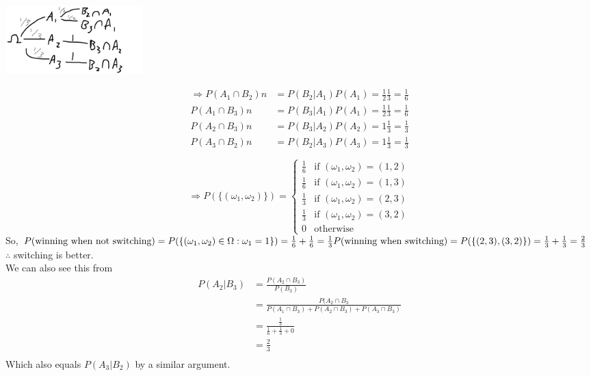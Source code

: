\documentclass{article}
\begin{document}
\begin{myex}{}{}
\begin{enumerate}
			\includegraphics[width=200px]{tree2.png}
			
			\begin{align*}
				\Rightarrow P(A_1\cap B_2) n&=P(B_2|A_1)P(A_1)=\frac{1}{2}\frac{1}{3}=\frac{1}{6}\\
				P(A_1\cap B_3) n&=P(B_3|A_1)P(A_1)=\frac{1}{2}\frac{1}{3}=\frac{1}{6}\\
				P(A_2\cap B_3) n&=P(B_3|A_2)P(A_2)=1\frac{1}{3}=\frac{1}{3}\\
				P(A_3\cap B_2) n&=P(B_2|A_3)P(A_3)=1\frac{1}{3}=\frac{1}{3}\\\\
			\end{align*}
			\[
				\Rightarrow	P(\{(\omega_1, \omega_2)\})=\begin{cases}
					\frac{1}{6} &\mbox{if } (\omega_1, \omega_2)=(1, 2)\\
					\frac{1}{6} &\mbox{if } (\omega_1, \omega_2)=(1, 3)\\
					\frac{1}{3} &\mbox{if } (\omega_1, \omega_2)=(2, 3)\\
					\frac{1}{3} &\mbox{if } (\omega_1, \omega_2)=(3, 2)\\
					0 &\mbox{otherwise}					
			\end{cases}
			\]
			So, $P(\mbox{winning when not switching})=P(\{(\omega_1, \omega_2)\in\Omega : \omega_1=1\})=\frac{1}{6}+\frac{1}{6}=\frac{1}{3}\\
			P(\mbox{winning when switching})=P(\{(2, 3), (3, 2)\})=\frac{1}{3}+\frac{1}{3}=\frac{2}{3}$
			$\therefore$ switching is better.\\
			
			We can also see this from
			\begin{align*}
				P(A_2|B_3)&=\frac{P(A_2\cap B_3)}{P(B_3)}\\
				&=\frac{P(A_2\cap B_3}{P(A_1\cap B_3)+P(A_2\cap B_3)+P(A_3\cap B_3)}\\
				&=\frac{\frac{1}{3}}{\frac{1}{6}+\frac{1}{3}+0}\\
				&=\frac{2}{3}\\
			\end{align*}
			Which also equals $P(A_3|B_2)$ by a similar argument.
		\end{enumerate}
	\end{myex}
	
\end{document}
